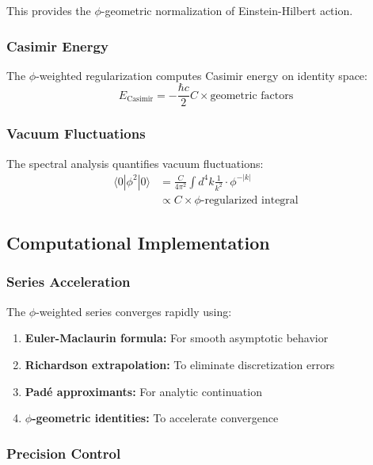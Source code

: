 This provides the $\phi$-geometric normalization of Einstein-Hilbert action.

\subsubsection{Casimir Energy}

The $\phi$-weighted regularization computes Casimir energy on identity space:
\begin{equation}
E_{\text{Casimir}} = -\frac{\hbar c}{2} C \times \text{geometric factors}
\end{equation}

\subsubsection{Vacuum Fluctuations}

The spectral analysis quantifies vacuum fluctuations:
\begin{align}
\langle 0| \phi^2 |0 \rangle &= \frac{C}{4\pi^2} \int d^4k \frac{1}{k^2} \cdot \phi^{-|k|}\\
&\propto C \times \text{$\phi$-regularized integral}
\end{align}

\subsection{Computational Implementation}

\subsubsection{Series Acceleration}

The $\phi$-weighted series converges rapidly using:
\begin{enumerate}
\item \textbf{Euler-Maclaurin formula:} For smooth asymptotic behavior
\item \textbf{Richardson extrapolation:} To eliminate discretization errors  
\item \textbf{Padé approximants:} For analytic continuation
\item \textbf{$\phi$-geometric identities:} To accelerate convergence
\end{enumerate}

\subsubsection{Precision Control}

